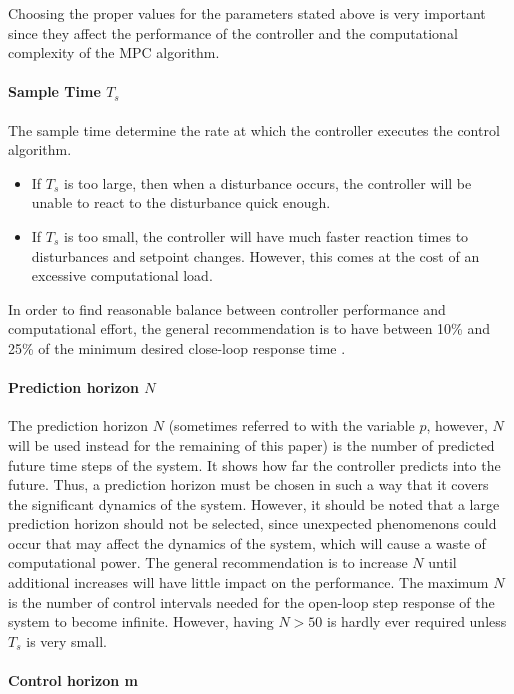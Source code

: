 \documentclass{thesisreport}
\begin{document}
\noindent Choosing the proper values for the parameters stated above is very important since they affect the performance of the controller and the computational complexity of the MPC algorithm.

\paragraph{Sample Time $T_s$} 

The sample time determine the rate at which the controller executes the control algorithm. \begin{itemize}
	\item If $T_s$ is too large, then when a disturbance occurs, the controller will be unable to react to the disturbance quick enough.
	\item If $T_s$ is too small, the controller will have much faster reaction times to disturbances and setpoint changes. However, this comes at the cost of an excessive computational load.
\end{itemize}

\noindent In order to find reasonable balance between controller performance and computational effort, the general recommendation is to have between 10\% and 25\% of the minimum desired close-loop response time .

\paragraph{Prediction horizon $N$} 

The prediction horizon $N$ (sometimes referred to with the variable $p$, however, $N$ will be used instead for the remaining of this paper) is the number of predicted future time steps of the system. It shows how far the controller predicts into the future. Thus, a prediction horizon must be chosen in such a way that it covers the significant dynamics of the system. However, it should be noted that a large prediction horizon should not be selected, since unexpected phenomenons could occur that may affect the dynamics of the system, which will cause a waste of computational power. The general recommendation is to increase $N$ until additional increases will have little impact on the performance. The maximum $N$ is the number of control intervals needed for the open-loop step response of the system to become infinite. However, having $N>50$ is hardly ever required unless $T_s$ is very small.

\paragraph{Control horizon m}
\end{document}
